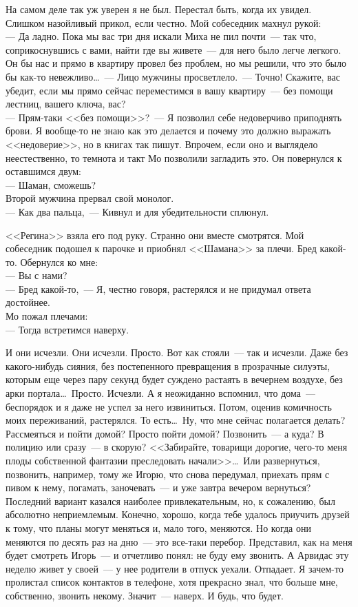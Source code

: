 На самом деле так уж уверен я не был. Перестал быть, когда их увидел. Слишком 
назойливый прикол, если честно. Мой собеседник махнул рукой:\\
--- Да ладно. Пока мы вас три дня искали Миха не пил почти~--- так что, 
соприкоснувшись с вами, найти где вы живете~--- для него было легче легкого. Он 
бы нас и прямо в квартиру провел без проблем, но мы решили, что это было бы как-то 
невежливо\ldots~--- Лицо мужчины просветлело.~--- Точно! Скажите, вас убедит, 
если мы прямо сейчас переместимся в вашу квартиру~--- без помощи лестниц, вашего ключа, 
вас?\\
--- Прям-таки <<без помощи>>?~--- Я позволил себе недоверчиво приподнять брови. Я 
вообще-то не знаю как это делается и почему это должно выражать <<недоверие>>, 
но в книгах так пишут. Впрочем, если оно и выглядело неестественно, то темнота и 
такт Мо позволили загладить это. Он повернулся к оставшимся двум:\\
--- Шаман, сможешь?\\
Второй мужчина прервал свой монолог.\\
--- Как два пальца,~--- Кивнул и для убедительности сплюнул.

<<Регина>> взяла его под руку. Странно они вместе смотрятся. Мой собеседник 
подошел к парочке и приобнял <<Шамана>> за плечи. Бред какой-то. Обернулся ко 
мне:\\
--- Вы с нами?\\
--- Бред какой-то,~--- Я, честно говоря, растерялся и не придумал ответа 
достойнее. \\
Мо пожал плечами:\\
--- Тогда встретимся наверху.

И они исчезли. Они исчезли. Просто. Вот как стояли~--- так и исчезли. Даже без 
какого-нибудь сияния, без постепенного превращения в прозрачные силуэты, 
которым 
еще через пару секунд будет суждено растаять в вечернем воздухе, без арки 
портала\ldots\ Просто. Исчезли. А я неожиданно вспомнил, что дома~--- 
беспорядок и я 
даже не успел за него извиниться. Потом, оценив комичность моих переживаний, 
растерялся. То есть\ldots\ Ну, что мне сейчас полагается делать? Рассмеяться и 
пойти 
домой? Просто пойти домой? Позвонить~--- а куда? В полицию или сразу~--- в 
скорую? 
<<Забирайте, товарищи дорогие, чего-то меня плоды собственной фантазии 
преследовать начали>>\ldots\ Или развернуться, позвонить, например, тому же 
Игорю, 
что снова передумал, приехать прям с пивом к нему, погамать, заночевать~--- и 
уже 
завтра вечером вернуться? Последний вариант казался наиболее привлекательным, 
но, к сожалению, был абсолютно неприемлемым. Конечно, хорошо, когда тебе 
удалось 
приучить друзей к тому, что планы могут меняться и, мало того, меняются. Но 
когда они меняются по десять раз на дню~--- это все-таки перебор. Представил, 
как 
на меня будет смотреть Игорь~--- и отчетливо понял: не буду ему звонить. А 
Арвидас 
эту неделю живет у своей~--- у нее родители в отпуск уехали. Отпадает. Я 
зачем-то 
пролистал список контактов в телефоне, хотя прекрасно знал, что больше мне, 
собственно, звонить некому. Значит~--- наверх. И будь, что будет.

